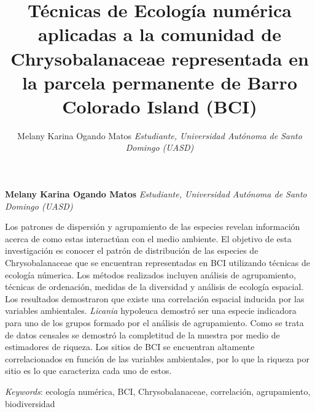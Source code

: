 \documentclass[11pt,]{article}
\title{Técnicas de Ecología numérica aplicadas a la comunidad de
Chrysobalanaceae representada en la parcela permanente de Barro Colorado
Island (BCI)\\[2\baselineskip]  }
\author{\Large Melany Karina Ogando Matos\vspace{0.05in} \newline\normalsize\emph{Estudiante, Universidad Autónoma de Santo Domingo (UASD)}  }
\date{}
\newcommand*{\authorfont}{\fontfamily{phv}\selectfont}
\renewenvironment{abstract}
 {{%
    \setlength{\leftmargin}{0mm}
    \setlength{\rightmargin}{\leftmargin}%
  }%
  \relax}
 {\endlist}
\begin{document}
	
%

{%
\setlength{\parindent}{0pt}
\thispagestyle{plain}
{\fontsize{18}{20}\selectfont\raggedright 
\maketitle  %

}

{
   \vskip 13.5pt\relax \normalsize\fontsize{11}{12} 
\textbf{\authorfont Melany Karina Ogando Matos} \hskip 15pt \emph{\small Estudiante, Universidad Autónoma de Santo Domingo (UASD)}   

}

}








\begin{abstract}

    \hbox{\vrule height .2pt width 39.14pc}

    \vskip 8.5pt %

\noindent Los patrones de dispersión y agrupamiento de las especies revelan
información acerca de como estas interactúan con el medio ambiente. El
objetivo de esta investigación es conocer el patrón de distribución de
las especies de Chrysobalanaceae que se encuentran representadas en BCI
utilizando técnicas de ecología númerica. Los métodos realizados
incluyen análisis de agrupamiento, técnicas de ordenación, medidas de la
diversidad y análisis de ecología espacial. Los resultados demostraron
que existe una correlación espacial inducida por las variables
ambientales. \emph{Licania }hypoleuca demostró ser una especie
indicadora para uno de los grupos formado por el análisis de
agrupamiento. Como se trata de datos censales se demostró la completitud
de la muestra por medio de estimadores de riqueza. Los sitios de BCI se
encuentran altamente correlacionados en función de las variables
ambientales, por lo que la riqueza por sitio es lo que caracteriza cada
uno de estos.


\vskip 8.5pt \noindent \emph{Keywords}: ecología numérica, BCI, Chrysobalanaceae, correlación, agrupamiento,
biodiversidad \par

    \hbox{\vrule height .2pt width 39.14pc}



\end{abstract}
\end{document}
